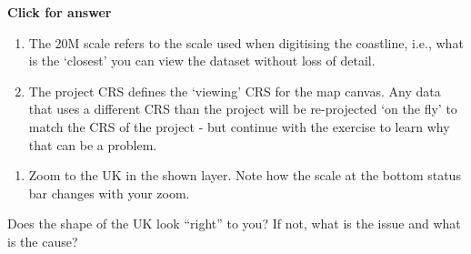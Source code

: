 \documentclass[
  letterpaper,
  DIV=11,
  numbers=noendperiod]{scrreprt}
\providecommand{\tightlist}{%
  \setlength{\itemsep}{0pt}\setlength{\parskip}{0pt}}\usepackage{longtable,booktabs,array}
\begin{document}
\begin{tcolorbox}[enhanced jigsaw, leftrule=.75mm, colframe=quarto-callout-important-color-frame, breakable, toprule=.15mm, bottomrule=.15mm, arc=.35mm, rightrule=.15mm, opacityback=0, colback=white, left=2mm]

\vspace{-3mm}\textbf{Click for answer}\vspace{3mm}

\begin{enumerate}
\def\labelenumi{\alph{enumi})}
\item
  The 20M scale refers to the scale used when digitising the coastline,
  i.e., what is the `closest' you can view the dataset without loss of
  detail.
\item
  The project CRS defines the `viewing' CRS for the map canvas. Any data
  that uses a different CRS than the project will be re-projected `on
  the fly' to match the CRS of the project - but continue with the
  exercise to learn why that can be a problem.
\end{enumerate}

\end{tcolorbox}

\begin{enumerate}
\def\labelenumi{(\arabic{enumi})}
\setcounter{enumi}{55}
\tightlist
\item
  Zoom to the UK in the shown layer. Note how the scale at the bottom
  status bar changes with your zoom.
\end{enumerate}

\begin{tcolorbox}[enhanced jigsaw, breakable, toptitle=1mm, colback=white, left=2mm, leftrule=.75mm, titlerule=0mm, colframe=quarto-callout-important-color-frame, opacityback=0, title=\textcolor{quarto-callout-important-color}{\faExclamation}\hspace{0.5em}{Stop and Think}, toprule=.15mm, opacitybacktitle=0.6, bottomtitle=1mm, colbacktitle=quarto-callout-important-color!10!white, bottomrule=.15mm, coltitle=black, rightrule=.15mm, arc=.35mm]

Does the shape of the UK look ``right'' to you? If not, what is the
issue and what is the cause?

\end{tcolorbox}
\end{document}

